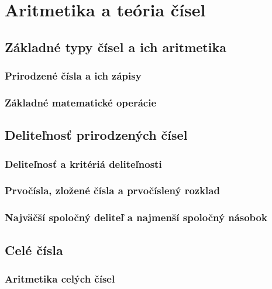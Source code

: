 \chapter{Aritmetika a teória čísel}
\label{chap:tc}

	
\section{Základné typy čísel a ich aritmetika}
	
\subsection{Prirodzené čísla a ich zápisy}
	
\subsection{Základné matematické operácie}
\newpage
	
\section{Deliteľnosť prirodzených čísel}

\subsection{Deliteľnosť a kritériá deliteľnosti}
	
\subsection{Prvočísla, zložené čísla a prvočíslený rozklad}

\subsection{Najväčší spoločný deliteľ a najmenší spoločný násobok}
\newpage



\section{Celé čísla}

\subsection{Aritmetika celých čísel}
\newpage


